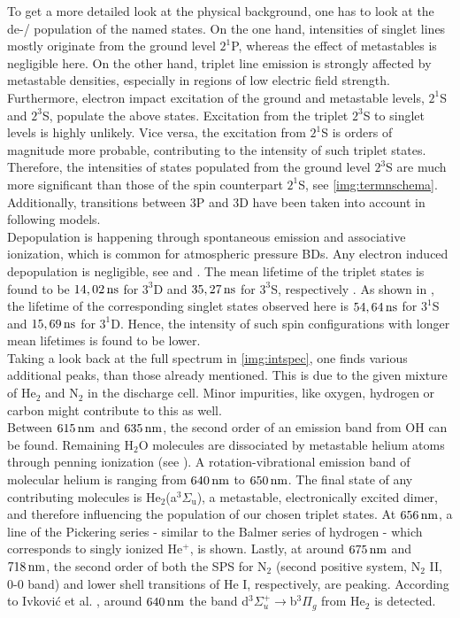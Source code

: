 \documentclass[a4paper,10pt,twoside]{article}
\newcommand{\ix}[1]{_\text{#1}}
\begin{document}
			To get a more detailed look at the physical background, one has to look at the de-/ population of the named states. On the one hand, intensities of singlet lines mostly originate from the ground level $2^1$P, whereas the effect of metastables is negligible here. On the other hand, triplet line emission is strongly affected by metastable densities, especially in regions of low electric field strength. Furthermore, electron impact excitation of the ground and metastable levels, $2^1$S and $2^3$S, populate the above states. Excitation from the triplet $2^3$S to singlet levels is highly unlikely. Vice versa, the excitation from $2^1$S is orders of magnitude more probable, contributing to the intensity of such triplet states. Therefore, the intensities of states populated from the ground level $2^3$S are much more significant than those of the spin counterpart $2^1$S, see \autoref{img:termnschema}. Additionally, transitions between 3P and 3D have been taken into account in following models.\\
			Depopulation is happening through spontaneous emission and associative ionization, which is common for atmospheric pressure BDs. Any electron induced depopulation is negligible, see \cite{PhysRevA.21.188} and \cite{0963-0252-14-4-011}. The mean lifetime of the triplet states is found to be $\unit[14,02]{ns}$ for $3^3$D and $\unit[35,27]{ns}$ for $3^3$S, respectively \cite{lifetimes}. As shown in \cite{linratio1_14}, the lifetime of the corresponding singlet states observed here is $\unit[54,64]{ns}$ for $3^1$S and $\unit[15,69]{ns}$ for $3^1$D. Hence, the intensity of such spin configurations with longer mean lifetimes is found to be lower.\\
			Taking a look back at the full spectrum in \autoref{img:intspec}, one finds various additional peaks, than those already mentioned. This is due to the given mixture of He$_2$ and N$_2$ in the discharge cell. Minor impurities, like oxygen, hydrogen or carbon might contribute to this as well.\\
			Between $\unit[615]{nm}$ and $\unit[635]{nm}$, the second order of an emission band from OH can be found. Remaining H$\ix{2}$O molecules are dissociated by metastable helium atoms through penning ionization (see \cite{brandenburg2004raeumlich}). A rotation-vibrational emission band of molecular helium is ranging from $\unit[640]{nm}$ to $\unit[650]{nm}$. The final state of any contributing molecules is He$\ix{2}$(a$^{3}\Sigma\ix{u}$), a metastable, electronically excited dimer, and therefore influencing the population of our chosen triplet states. At $\unit[656]{nm}$, a line of the Pickering series - similar to the Balmer series of hydrogen - which corresponds to singly ionized He$^+$, is shown. Lastly, at around $\unit[675]{nm}$ and $\unit[718]{nm}$, the second order of both the SPS for N$\ix{2}$ (second positive system, N$\ix{2}$ II, 0-0 band) and lower shell transitions of He I, respectively, are peaking.	According to Ivkovi{\'c} et al. \cite{linratio1_14}, around $\unit[640]{nm}$ the band d$^3\Sigma^+_u\rightarrow$b$^3\Pi_g$ from He$_2$ is detected.
		
\end{document}
